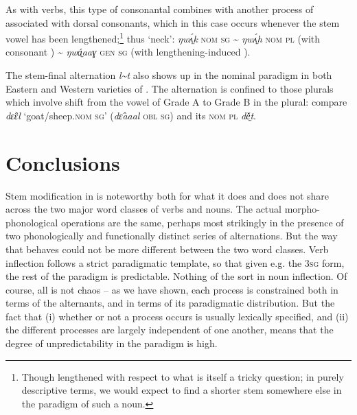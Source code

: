\documentclass[output=paper,newtxmath,modfonts,nonflat]{langsci/langscibook}
\begin{document}
As with verbs, this type of consonantal  combines with another process of  associated with dorsal consonants, which in this case occurs whenever the stem vowel has been lengthened;\footnote{Though lengthened with respect to what is itself a tricky question; in purely descriptive terms, we would expect to find a shorter stem somewhere else in the paradigm of such a noun.} thus ‘neck’: \textit{ŋwʌ̤́k} \textsc{nom sg} {\textasciitilde} \textit{ŋwʌ̤́h} \textsc{nom pl} (with consonant ) {\textasciitilde} \textit{ŋwá̤aaɣ} \textsc{gen sg} (with lengthening-induced ).

The stem-final alternation \textit{l{\textasciitilde}t} also shows up in the nominal paradigm in both Eastern and Western varieties of . The alternation is confined to those plurals which involve shift from the vowel of Grade A to Grade B in the plural:  compare \textit{dɛ̂ɛl} ‘goat/sheep.\textsc{nom sg}’ (\textit{dɛ̂aaal} \textsc{obl sg}) and its \textsc{nom pl} \textit{dě̤t}.

\section{Conclusions} %
\label{sec:monich:6}

Stem modification in  is noteworthy both for what it does and does not share across the two major word classes of verbs and nouns. The actual morpho-phonological operations are the same, perhaps most strikingly in the presence of two phonologically and functionally distinct series of  alternations. But the way that  behaves could not be more different between the two word classes. Verb inflection follows a strict paradigmatic template, so that given e.g. the 3\textsc{sg} form, the rest of the paradigm is predictable. Nothing of the sort in noun inflection. Of course, all is not chaos – as we have shown, each  process is constrained both in terms of the alternants, and in terms of its paradigmatic distribution. But the fact that (i) whether or not a  process occurs is usually lexically specified, and (ii) the different  processes are largely independent of one another, means that the degree of unpredictability in the paradigm is high.
\end{document}
